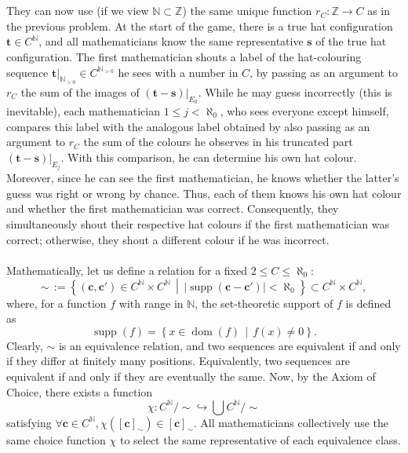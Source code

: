 \documentclass[11pt, a4paper, oneside]{article}
\theoremstyle{remark}
\theoremstyle{lemma}
\begin{document}
\\\\
They can now use (if we view \( \mathbb{N} \subset \mathbb{Z} \)) the same unique function \( r_C : \mathbb{Z} \rightarrow C \) as in the previous problem. At the start of the game, there is a true hat configuration \( \mathbf{t} \in C^{\mathbb{N}} \), and all mathematicians know the same representative \( \mathbf{s} \) of the true hat configuration. The first mathematician shouts a label of the hat-colouring sequence \( \left. \mathbf{t} \right|_{\mathbb{N}_{>0}} \in C^{\mathbb{N}_{>0}} \) he sees with a number in \( C \), by passing as an argument to \( r_C \) the sum of the images of \( \left.\left( \mathbf{t} - \mathbf{s} \right) \right|_{E_0} \). While he may guess incorrectly (this is inevitable), each mathematician \( 1 \leq j < \aleph_0 \), who sees everyone except himself, compares this label with the analogous label obtained by also passing as an argument to \( r_C \) the sum of the colours he observes in his truncated part \( \left.\left( \mathbf{t} - \mathbf{s} \right) \right|_{E_j} \). With this comparison, he can determine his own hat colour. Moreover, since he can see the first mathematician, he knows whether the latter’s guess was right or wrong by chance. Thus, each of them knows his own hat colour and whether the first mathematician was correct. Consequently, they simultaneously shout their respective hat colours if the first mathematician was correct; otherwise, they shout a different colour if he was incorrect.
\\\\
Mathematically, let us define a relation for a fixed \( 2 \leq C \leq \aleph_0 \):
\[
\sim\,:= \left\{ \left( \mathbf{c}, \mathbf{c}' \right) \in C^{\mathbb{N}} \times C^{\mathbb{N}} \,\middle|\, \left| \operatorname{supp} \left( \mathbf{c} - \mathbf{c}' \right) \right| < \aleph_0 \right\} \subset C^{\mathbb{N}} \times C^{\mathbb{N}},
\]
where, for a function \( f \) with range in \( \mathbb{N} \), the set-theoretic support of \( f \) is defined as
\[
\operatorname{supp} \left( f \right) = \left\{ x \in \operatorname{dom} \left( f \right) \,\middle|\, f(x) \neq 0 \right\}.
\]
Clearly, \( \sim \) is an equivalence relation, and two sequences are equivalent if and only if they differ at finitely many positions. Equivalently, two sequences are equivalent if and only if they are eventually the same. Now, by the Axiom of Choice, there exists a function
\[
\chi \colon C^{\mathbb{N}} / {\sim} \hookrightarrow \bigcup C^{\mathbb{N}} / {\sim}
\]
satisfying \( \forall \mathbf{c} \in C^{\mathbb{N}}, \chi\left( \left[ \mathbf{c} \right]_{\sim} \right) \in \left[ \mathbf{c} \right]_{\sim} \). All mathematicians collectively use the same choice function \( \chi \) to select the same representative of each equivalence class.
\end{document}
